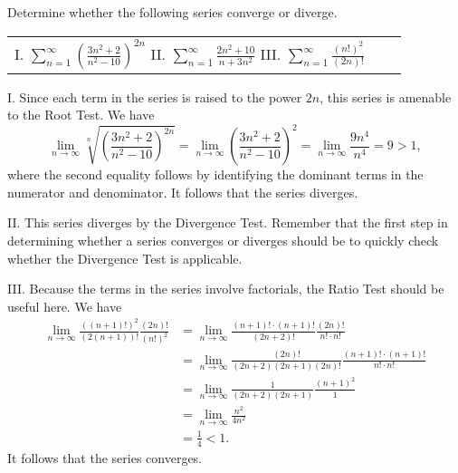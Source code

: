 \documentclass[]{ximera}
\begin{document}
\begin{problem}
Determine whether the following series converge or diverge.
\begin{center}
\begin{tabular}{lll}
I. $\sum_{n=1}^\infty \left(\frac{3n^2+2}{n^2-10}\right)^{2n}$ \hspace{.3in} II. $\sum_{n=1}^\infty \frac{2n^2+10}{n+3n^2}$ \hspace{.3in} III. $\sum_{n=1}^\infty \frac{(n!)^2}{(2n)!}$
\end{tabular}
\end{center}

\begin{freeResponse}
I. Since each term in the series is raised to the power $2n$, this series is amenable to the Root Test. We have 
$$
\lim_{n \rightarrow \infty} \sqrt[n]{\left(\frac{3n^2+2}{n^2-10}\right)^{2n}} = \lim_{n \rightarrow \infty} \left(\frac{3n^2+2}{n^2-10}\right)^{2} = \lim_{n \rightarrow \infty} \frac{9 n^4}{n^4} = 9 > 1,
$$
where the second equality follows by identifying the dominant terms in the numerator and denominator. It follows that the series diverges.

II. This series diverges by the Divergence Test. Remember that the first step in determining whether a series converges or diverges should be to quickly check whether the Divergence Test is applicable.

III. Because the terms in the series involve factorials, the Ratio Test should be useful here. We have 
\begin{align*}
\lim_{n \rightarrow \infty} \frac{((n+1)!)^2}{(2(n+1))!} \frac{(2n)!}{(n!)^2} &= \lim_{n \rightarrow \infty} \frac{(n+1)! \cdot (n+1)!}{(2n+2)!} \frac{(2n)!}{n! \cdot n!} \\
&= \lim_{n \rightarrow \infty} \frac{(2n)!}{(2n+2)(2n+1)(2n)!} \frac{(n+1)! \cdot (n+1)!}{n! \cdot n!} \\
&= \lim_{n \rightarrow \infty} \frac{1}{(2n+2)(2n+1)} \frac{(n+1)^2}{1} \\
&= \lim_{n \rightarrow \infty} \frac{n^2}{4n^2} \\
&= \frac{1}{4} < 1.
\end{align*}
It follows that the series converges.
\end{freeResponse}
\end{problem}
\end{document}
